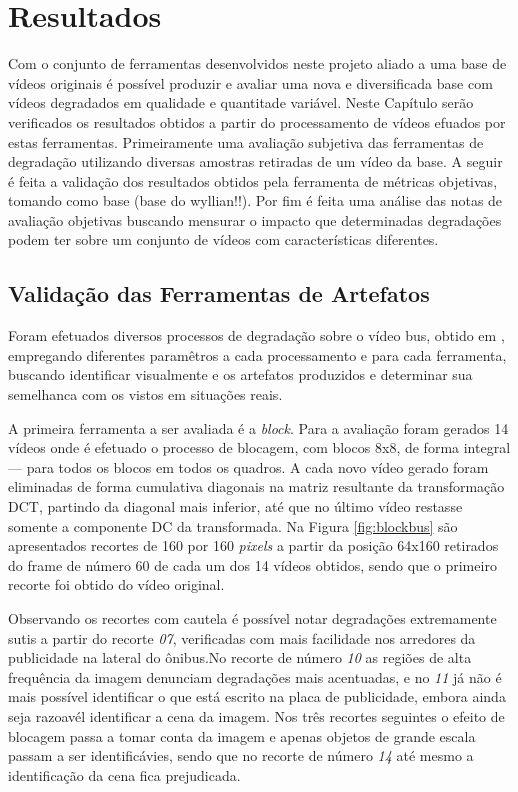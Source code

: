 
\chapter{Resultados} %

Com o conjunto de ferramentas desenvolvidos neste projeto aliado a uma base de vídeos originais é possível produzir e avaliar uma nova e diversificada base com vídeos degradados em qualidade e quantitade variável.
Neste Capítulo serão verificados os resultados obtidos a partir do processamento de vídeos efuados por estas ferramentas. Primeiramente uma avaliação subjetiva das ferramentas de degradação utilizando diversas amostras retiradas de um vídeo da base. A seguir é feita a validação dos resultados obtidos pela ferramenta de métricas objetivas, tomando como base (base do wyllian!!).
Por fim é feita uma análise das notas de avaliação objetivas buscando mensurar o impacto que determinadas degradações podem ter sobre um conjunto de vídeos com características diferentes.

\section{Validação das Ferramentas de Artefatos}

Foram efetuados diversos processos de degradação sobre o vídeo bus, obtido em \cite{tracevideoseq},  empregando diferentes paramêtros a cada processamento e para cada ferramenta, buscando identificar visualmente e os artefatos produzidos e determinar sua semelhanca com os vistos em situações reais.

A primeira ferramenta a ser avaliada é a \emph{block}.
Para a avaliação foram gerados 14 vídeos onde é efetuado o processo de blocagem, com blocos 8x8, de forma integral --- para todos os blocos em todos os quadros. A cada novo vídeo gerado foram eliminadas de forma cumulativa diagonais na matriz resultante da transformação DCT, partindo da diagonal mais inferior, até que no último vídeo restasse somente a componente DC da transformada. 
Na Figura \ref{fig:blockbus} são apresentados recortes de 160 por 160 \emph{pixels} a partir da posição 64x160 retirados do frame de número 60 de cada um dos 14 vídeos obtidos, sendo que o primeiro recorte foi obtido do vídeo original.

Observando os recortes com cautela é possível notar degradações extremamente sutis a partir do recorte \emph{07}, verificadas com mais facilidade nos arredores da publicidade na lateral do ônibus.No recorte de número \emph{10} as regiões de alta frequência da imagem denunciam degradações mais acentuadas, e no \emph{11} já não é mais possível identificar o que está escrito na placa de publicidade, embora ainda seja razoavél identificar a cena da imagem.
Nos três recortes seguintes o efeito de blocagem passa a tomar conta da imagem e apenas objetos de grande escala passam a ser identificávies, sendo que no recorte de número \emph{14} até mesmo a identificação da cena fica prejudicada.

